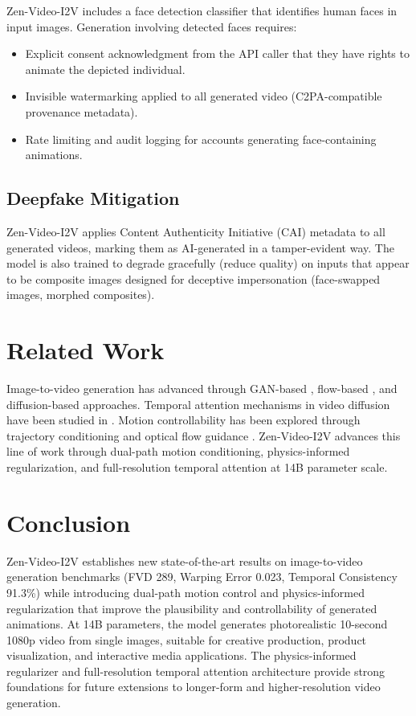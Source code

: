 \documentclass[11pt,a4paper]{article}
\begin{document}
Zen-Video-I2V includes a face detection classifier that identifies human faces in input images. Generation involving detected faces requires:

\begin{itemize}
  \item Explicit consent acknowledgment from the API caller that they have rights to animate the depicted individual.
  \item Invisible watermarking applied to all generated video (C2PA-compatible provenance metadata).
  \item Rate limiting and audit logging for accounts generating face-containing animations.
\end{itemize}

\subsection{Deepfake Mitigation}

Zen-Video-I2V applies Content Authenticity Initiative (CAI) metadata to all generated videos, marking them as AI-generated in a tamper-evident way. The model is also trained to degrade gracefully (reduce quality) on inputs that appear to be composite images designed for deceptive impersonation (face-swapped images, morphed composites).

\section{Related Work}

Image-to-video generation has advanced through GAN-based \cite{vidgan}, flow-based \cite{flowgen}, and diffusion-based \cite{stablevideo,svd} approaches. Temporal attention mechanisms in video diffusion have been studied in \cite{tune-a-video,videocrafter}. Motion controllability has been explored through trajectory conditioning \cite{dragnuwa} and optical flow guidance \cite{motionctrl}. Zen-Video-I2V advances this line of work through dual-path motion conditioning, physics-informed regularization, and full-resolution temporal attention at 14B parameter scale.

\section{Conclusion}

Zen-Video-I2V establishes new state-of-the-art results on image-to-video generation benchmarks (FVD 289, Warping Error 0.023, Temporal Consistency 91.3\%) while introducing dual-path motion control and physics-informed regularization that improve the plausibility and controllability of generated animations. At 14B parameters, the model generates photorealistic 10-second 1080p video from single images, suitable for creative production, product visualization, and interactive media applications. The physics-informed regularizer and full-resolution temporal attention architecture provide strong foundations for future extensions to longer-form and higher-resolution video generation.
\end{document}
